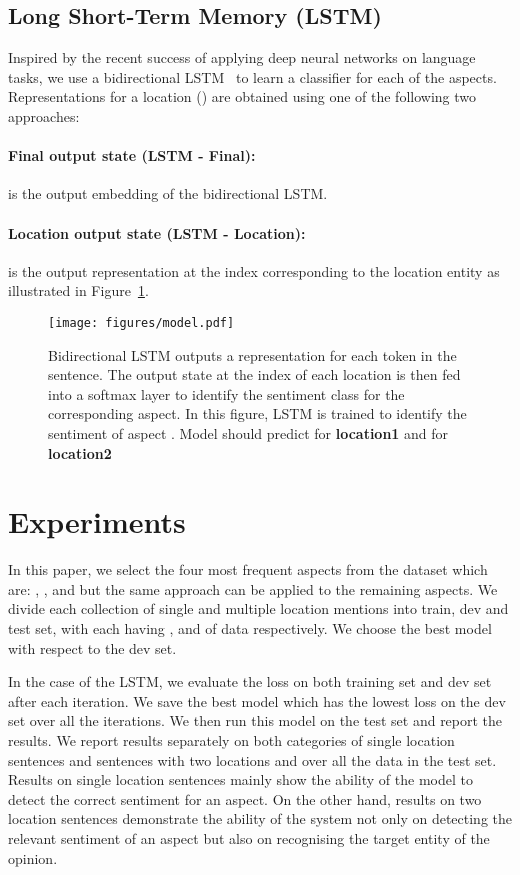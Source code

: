 \documentclass[11pt]{article}
\begin{document}
    \subsection{Long Short-Term Memory (LSTM)}
        Inspired by the recent success of applying deep neural networks on language tasks, we use a bidirectional LSTM~\cite{hochreiter1997long} to learn a classifier for each of the aspects. Representations for a location () are obtained using one of the following two approaches:
        \paragraph{Final output state (LSTM - Final): }  is the output embedding of the bidirectional LSTM.
        \paragraph{Location output state (LSTM - Location):}  is the output representation at the index corresponding to the location entity as illustrated in Figure~\ref{fig:model_bi_lstm}.
        \begin{figure}[ht]
          \centering
              \texttt{[image: figures/model.pdf]}
          \caption{Bidirectional LSTM outputs a representation for each token in the sentence. The output state at the index of each location is then fed into a softmax layer to identify the sentiment class for the corresponding aspect. In this figure, LSTM is trained to identify the sentiment of aspect . Model should predict  for \textbf{location1} and  for \textbf{location2}}
          \label{fig:model_bi_lstm}
        \end{figure}
        
\section{Experiments}
    In this paper, we select the four most frequent aspects from the dataset which are: , ,  and  but the same approach can be applied to the remaining aspects. We divide each collection of single and multiple location mentions into train, dev and test set, with each having ,  and  of data respectively. We choose the best model with respect to the dev set. 
    
    In the case of the LSTM, we evaluate the loss on both training set and dev set after each iteration. We save the best model which has the lowest loss on the dev set over all the iterations. We then run this model on the test set and report the results. We report results separately on both categories of single location sentences and sentences with two locations and over all the data in the test set. Results on single location sentences mainly show the ability of the model to detect the correct sentiment for an aspect. On the other hand, results on two location sentences demonstrate the ability of the system not only on detecting the relevant sentiment of an aspect but also on recognising the target entity of the opinion.
\end{document}

